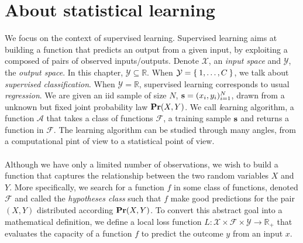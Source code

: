 
\section{About statistical learning}
\label{sec:about_statistical_learning}
We focus on the context of supervised learning. Supervised learning aims at
building a function that predicts an output from a given input, by exploiting a
 composed of pairs of observed inputs/outputs. Denote
$\mathcal{X}$, an \emph{input space} and $\mathcal{Y}$, the \emph{output
space}.  In this chapter, $\mathcal{Y} \subseteq \mathbb{R}$. When
$\mathcal{Y}=\Set{1, \ldots, C}$, we talk about \emph{supervised
classification}.  When $\mathcal{Y}=\mathbb{R}$, supervised learning
corresponds to  usual \emph{regression}. We are given an \acs{iid} sample of
size $N$, $\boldsymbol{\mathbf{s}}=(x_i, y_i)_{i=1}^N$, drawn from a unknown but fixed
joint probability law ${\mathbf{{Pr}}}(X,Y)$. We call {\emph learning algorithm},
a function $\mathcal{A}$ that takes a class of functions $\mathcal{F}$, a
training sample $\boldsymbol{\mathbf{s}}$ and returns a function in $\mathcal{F}$. The learning
algorithm can be studied through many angles, from a computational pint of view
to a statistical point of view.
\paragraph{}
Although we have only a limited number of observations, we wish to build a
function that captures the relationship between the two random variables $X$
and $Y$. More specifically, we search for a function $f$ in some class of
functions, denoted $\mathcal{F}$ and called the \emph{hypotheses class} such
that $f$ make good predictions for the pair $(X,Y)$ distributed according
${\mathbf{{Pr}}}(X,Y)$. To convert this abstract goal into a mathematical
definition, we define a local loss function
$L:\mathcal{X}\times\mathcal{F}\times\mathcal{Y} \to \mathbb{R}_+$ that
evaluates the capacity of a function $f$ to predict the outcome $y$ from an
input $x$.
